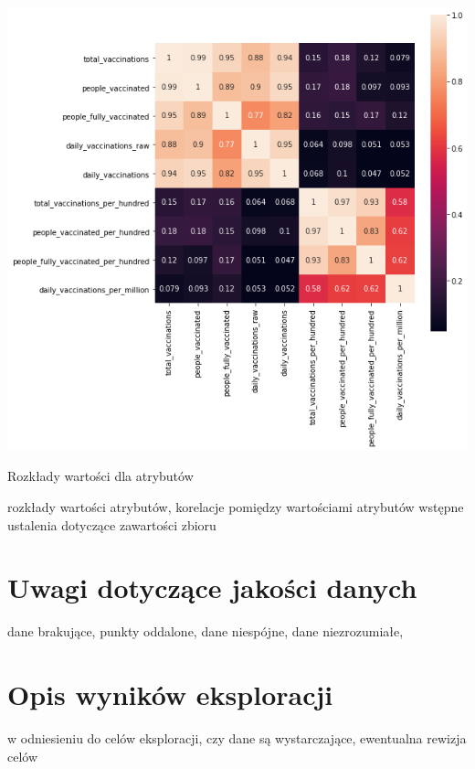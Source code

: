 \documentclass[12pt, oneside, openany]{article}
\begin{document}
\begin{center}
\includegraphics[scale=0.7]
{../img/corelation.png} 
\end{center}


Rozkłady wartości dla atrybutów 

rozkłady wartości atrybutów, korelacje pomiędzy wartościami atrybutów
wstępne ustalenia dotyczące zawartości zbioru 
\section{Uwagi dotyczące jakości danych}
dane brakujące, punkty oddalone, dane niespójne, dane niezrozumiałe,
\section{Opis wyników eksploracji}

w odniesieniu do celów eksploracji, czy dane są wystarczające, ewentualna rewizja celów
\end{document}
